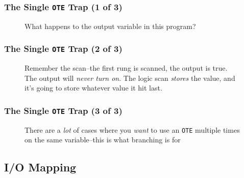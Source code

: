 \begin{frame}
    \frametitle{The Single \texttt{OTE} Trap (1 of 3)}

    \begin{figure}
        \centering
        \resizebox{\linewidth}{!}{
            
        }

        \vspace{0.5em}
        {\footnotesize What happens to the output variable in this program?\par}
    \end{figure}
\end{frame}

\begin{frame}
    \frametitle{The Single \texttt{OTE} Trap (2 of 3)}

    \begin{figure}
        \centering
        \resizebox{\linewidth}{!}{
            
        }

        \vspace{0.5em}
        {\footnotesize Remember the scan--the first rung is scanned, the output is true. The output will \emph{never turn on}. The logic scan \emph{stores} the value, and it's going to store whatever value it hit last.\par}
    \end{figure}
\end{frame}

\begin{frame}
    \frametitle{The Single \texttt{OTE} Trap (3 of 3)}

    \begin{figure}
        \centering
        \resizebox{\linewidth}{!}{
            
        }

        \vspace{0.5em}
        {\footnotesize There are a \emph{lot} of cases where you \emph{want} to use an \texttt{OTE} multiple times on the same variable--this is what branching is for\par}
    \end{figure}
\end{frame}

\subsection{I/O Mapping}

